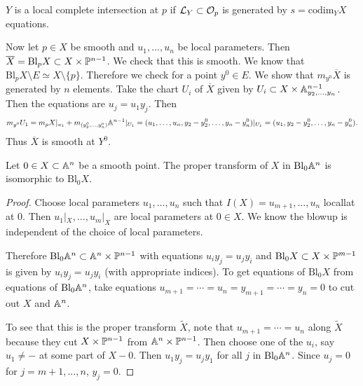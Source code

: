 \documentclass[twoside, 10pt]{article}
\begin{document}
    \begin{rmk} $Y$ is a local complete intersection at $p$ if $\mc{L}_Y
    \subset \mc{O}_p$ is generated by $s= \mathrm{codim}_Y X$ equations.
\end{rmk}

    Now let $p \in X$ be smooth and $u_1, \ldots, u_n$ be local parameters.
    Then $\overline{X} = \mathrm{Bl}_p X \subset X \times \P^{n-1}$. We check
    that this is smooth. We know that $\mathrm{Bl}_p X \setminus E \simeq X
    \setminus \{p\}$. Therefore we check for a point $y^0 \in E$. We show that
    $m_{y^0} \overline{X}$ is generated by $n$ elements. Take the chart $U_i$
    of $\overline{X}$ given by $U_i \subset X \times \A^{n-1}_{y_2, \ldots,
    y_n}$. Then the equations are $u_j=u_1y_j$. Then \[m_{y^0} U_1 = m_p
    X|_{u_1} + m_{(y_2^0, \ldots, y_n^0)} \A^{n-1}|_{U_1} = (u_1, \ldots, u_n,
y_2-y_2^0, \ldots, y_n-y_n^0)|_{U_1} = (u_1, y_2-y_2^0, \ldots, y_n-y_n^0).\]
Thus $\overline{X}$ is smooth at $Y^0$.

    \begin{thm} Let $0 \in X \subset \A^n$ be a smooth point. The proper
        transform of $X$ in $\mathrm{Bl}_0 \A^n$ is isomorphic to
        $\mathrm{Bl}_0 X$.  \begin{proof} Choose local parameters $u_1, \ldots,
            u_n$ such that $I(X) = u_{m+1}, \ldots, u_n$ locallat at $0$. Then
            $u_1|_X, \ldots, u_m|_X$ are local parameters at $0 \in X$. We know
            the blowup is independent of the choice of local parameters.

            Therefore $\mathrm{Bl}_0 \A^n \subset \A^n \times \P^{n-1}$ with
            equations $u_iy_j = u_jy_i$ and $\mathrm{Bl}_0 X \subset X \times
            \P^{m-1}$ is given by $u_iy_j = u_jy_i$ (with appropriate indices).
            To get equations of $\mathrm{Bl}_0 X$ from equations of
            $\mathrm{Bl}_0 \A^n$, take equations $u_{m+1} = \cdots = u_n =
            y_{m+1} = \cdots = y_n = 0$ to cut out $X$ and $\A^n$.

            To see that this is the proper transform $\widetilde{X}$, note that
            $u_{m+1} = \cdots = u_n$ along $\widetilde{X}$ because they cut $X
            \times \P^{n-1}$ from $\A^n \times \P^{n-1}$. Then choose one of
            the $u_i$, say $u_1 \neq -$ at some part of $X - 0$. Then
        $u_1y_j=u_jy_1$ for all $j$ in $\mathrm{Bl}_0 \A^n$. Since $u_j=0$ for
    $j=m+1, \ldots, n$, $y_j = 0$.  \end{proof} \end{thm}
    
\end{document}
